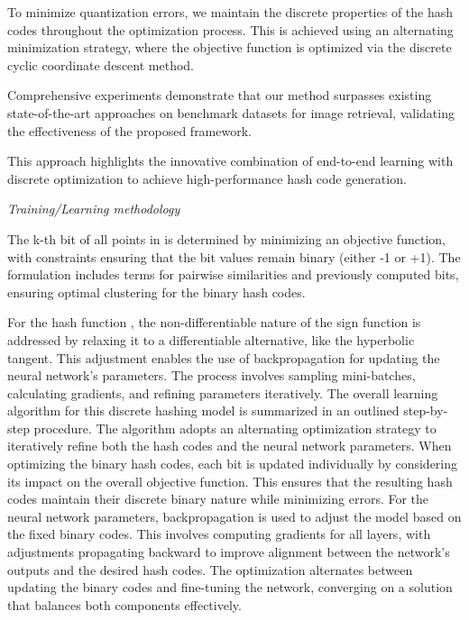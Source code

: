 To minimize quantization errors, we maintain the discrete properties of the hash codes throughout the optimization process. This is achieved using an alternating minimization strategy, where the objective function is optimized via the discrete cyclic coordinate descent method.

Comprehensive experiments demonstrate that our method surpasses existing state-of-the-art approaches on benchmark datasets for image retrieval, validating the effectiveness of the proposed framework.

This approach highlights the innovative combination of end-to-end learning with discrete optimization to achieve high-performance hash code generation.

\textit{Training/Learning methodology}
	
The k-th bit of all points in is determined by minimizing an objective function, with constraints ensuring that the bit values remain binary (either -1 or +1). The formulation includes terms for pairwise similarities and previously computed bits, ensuring optimal clustering for the binary hash codes.

For the hash function , the non-differentiable nature of the sign function is addressed by relaxing it to a differentiable alternative, like the hyperbolic tangent. This adjustment enables the use of backpropagation for updating the neural network's parameters. The process involves sampling mini-batches, calculating gradients, and refining parameters iteratively. The overall learning algorithm for this discrete hashing model is summarized in an outlined step-by-step procedure.
The algorithm adopts an alternating optimization strategy to iteratively refine both the hash codes and the neural network parameters. When optimizing the binary hash codes, each bit is updated individually by considering its impact on the overall objective function. This ensures that the resulting hash codes maintain their discrete binary nature while minimizing errors.
For the neural network parameters, backpropagation is used to adjust the model based on the fixed binary codes. This involves computing gradients for all layers, with adjustments propagating backward to improve alignment between the network's outputs and the desired hash codes. The optimization alternates between updating the binary codes and fine-tuning the network, converging on a solution that balances both components effectively.
\cite{10.5555/3294996.3295009}


